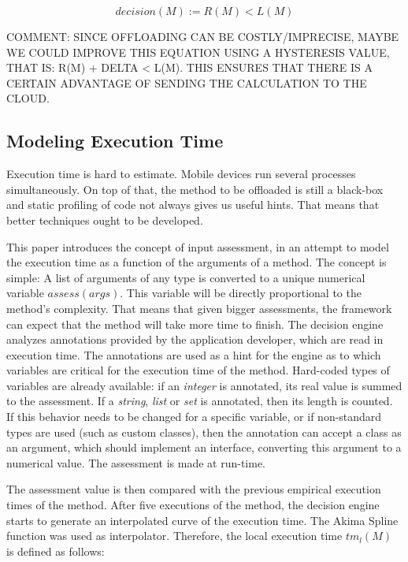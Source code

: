 \documentclass[10pt, conference, letterpaper]{IEEEtran}
\begin{document}
  \begin{equation}
    decision(M) := R(M) < L(M)
  \end{equation}
  
  {\color{red} COMMENT: SINCE OFFLOADING CAN BE COSTLY/IMPRECISE, MAYBE WE COULD IMPROVE THIS EQUATION USING A HYSTERESIS VALUE, THAT IS:  R(M) + DELTA < L(M). THIS ENSURES THAT THERE IS A CERTAIN ADVANTAGE OF SENDING THE CALCULATION TO THE CLOUD.}

\subsection{Modeling Execution Time}
\label{sec:time}

 Execution time is hard to estimate. Mobile devices run several processes simultaneously. On top of that, the method to be offloaded is still a black-box and static profiling of code not always gives us useful hints. That means that better techniques ought to be developed.
  
  This paper introduces the concept of input assessment, in an attempt to model the execution time as a function of the arguments of a method. The concept is simple: A list of arguments of any type is converted to a unique numerical variable $assess(args)$. This variable will be directly proportional to the method's complexity. That means that given bigger assessments, the framework can expect that the method will take more time to finish. The decision engine analyzes annotations provided by the application developer, which are read in execution time. The annotations are used as a hint for the engine as to which variables are critical for the execution time of the method. Hard-coded types of variables are already available: if an \textit{integer} is annotated, its real value is summed to the assessment. If a \textit{string}, \textit{list} or \textit{set} is annotated, then its length is counted. If this behavior needs to be changed for a specific variable, or if non-standard types are used (such as custom classes), then the annotation can accept a class as an argument, which should implement an interface, converting this argument to a numerical value. The assessment is made at run-time. 

  The assessment value is then compared with the previous empirical execution times of the method. After five executions of the method, the decision engine starts to generate an interpolated curve of the execution time. The Akima Spline function was used as interpolator. Therefore, the local execution time $tm_{l}(M)$ is defined as follows:
\end{document}
